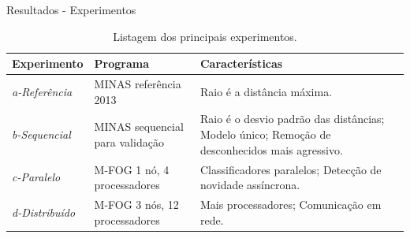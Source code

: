\documentclass[aspectratio=1610,10pt]{beamer}
\newcommand{\mfog}{M-FOG\xspace}
\newcommand{\minas}{MINAS\xspace}
\begin{document}
\newcommand{\expA}{\textit{a-Referência}\xspace}
\newcommand{\expB}{\textit{b-Sequencial}\xspace}
\newcommand{\expC}{\textit{c-Paralelo}\xspace}
\newcommand{\expD}{\textit{d-Distribuído}\xspace}
\begin{frame}[fragile]{Resultados - Experimentos}
    \begin{table}[htb]
      \centering
      \caption{Listagem dos principais experimentos.}
      \begin{tabular}{p{}|p{}|p{}}
      \textbf{Experimento} & \textbf{Programa}                 & \textbf{Características} \\\hline
      \expA                & \minas referência 2013            & Raio é a distância máxima. \\\hline
      \expB                & \minas sequencial para validação  & 
        Raio é o desvio padrão das distâncias;
        Modelo único;
        Remoção de desconhecidos mais agressivo. \\\hline
      \expC                & \mfog 1 nó, 4 processadores       & 
        Classificadores paralelos;
        Detecção de novidade assíncrona. \\\hline
      \expD                & \mfog 3 nós, 12 processadores     &
        Mais processadores;
        Comunicação em rede.
      \end{tabular}
    \end{table}
\end{frame}
\end{document}
